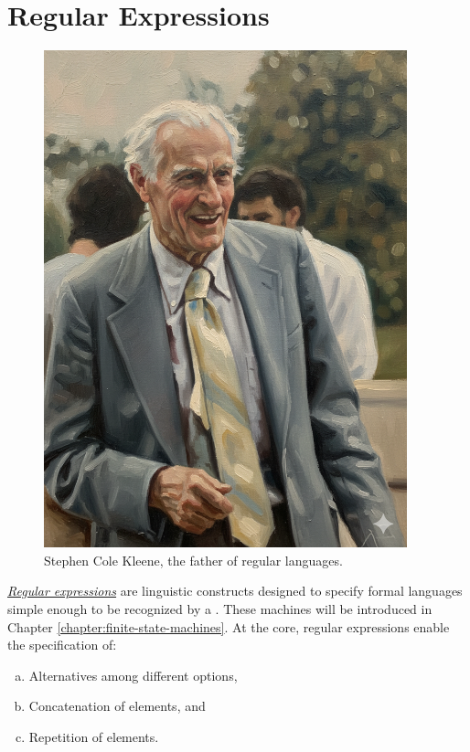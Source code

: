 
\chapter{Regular Expressions \label{chapter:regular-expressions}}

\begin{figure}[h]  %
\centering
  \includegraphics[width=10.5cm]{Abbildungen/Stephen_Cole_Kleene.png}
\caption{Stephen Cole Kleene, the father of regular languages.}
\label{fig:chapter-image}
\end{figure}

\href{http://en.wikipedia.org/wiki/Regular_expression}{\emph{Regular expressions}} 
are linguistic constructs designed to specify formal languages simple enough to be recognized by a
.  These machines will be introduced in Chapter \ref{chapter:finite-state-machines}.
At the core, regular expressions enable the specification of:  
\begin{enumerate}[(a)]
\item Alternatives among different options,
\item Concatenation of elements, and
\item Repetition of elements.
\end{enumerate}

